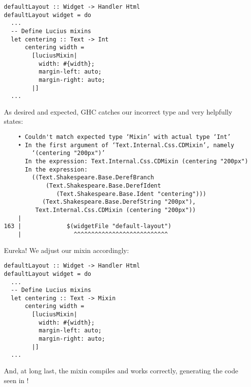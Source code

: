 \begin{Verbatim}
defaultLayout :: Widget -> Handler Html
defaultLayout widget = do
  ...
  -- Define Lucius mixins
  let centering :: Text -> Int
      centering width =
        [luciusMixin|
          width: #{width};
          margin-left: auto;
          margin-right: auto;
        |]
  ...
\end{Verbatim}

As desired and expected, GHC catches our incorrect type and very helpfully states:

\begin{Verbatim}
    • Couldn't match expected type ‘Mixin’ with actual type ‘Int’
    • In the first argument of ‘Text.Internal.Css.CDMixin’, namely
        ‘(centering "200px")’
      In the expression: Text.Internal.Css.CDMixin (centering "200px")
      In the expression:
        ((Text.Shakespeare.Base.DerefBranch
            (Text.Shakespeare.Base.DerefIdent
               (Text.Shakespeare.Base.Ident "centering")))
           (Text.Shakespeare.Base.DerefString "200px"), 
         Text.Internal.Css.CDMixin (centering "200px"))
    |
163 |             $(widgetFile "default-layout")
    |               ^^^^^^^^^^^^^^^^^^^^^^^^^^^
\end{Verbatim}

Eureka! We adjust our mixin accordingly:

\begin{Verbatim}
defaultLayout :: Widget -> Handler Html
defaultLayout widget = do
  ...
  -- Define Lucius mixins
  let centering :: Text -> Mixin
      centering width =
        [luciusMixin|
          width: #{width};
          margin-left: auto;
          margin-right: auto;
        |]
  ...
\end{Verbatim}

And, at long last, the mixin compiles and works correctly, generating the code seen in ! 

